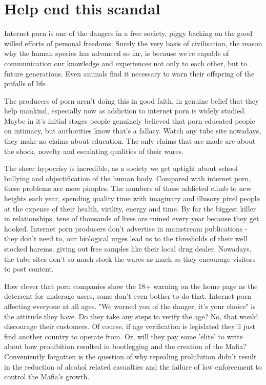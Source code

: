 \documentclass[easypeasy.tex]{subfiles}
\begin{document}
\section{Help end this scandal}

Internet porn is one of the dangers in a free society, piggy backing on the good willed efforts of personal freedoms. Surely the very basis of civilisation, the reason why the human species has advanced so far, is because we're capable of communication our knowledge and experiences not only to each other, but to future generations. Even animals find it necessary to warn their offspring of the pitfalls of life

The producers of porn aren't doing this in good faith, in genuine belief that they help mankind, especially now as addiction to internet porn is widely studied. Maybe in it's initial stages people genuinely believed that porn educated people on intimacy, but authorities know that's a fallacy. Watch any tube site nowadays, they make no claims about education. The only claims that are made are about the shock, novelty and escalating qualities of their wares.

The sheer hypocrisy is incredible, as a society we get uptight about school bullying and objectification of the human body. Compared with internet porn, these problems are mere pimples. The numbers of those addicted climb to new heights each year, spending quality time with imaginary and illusory pixel people at the expense of their health, virility, energy and time. By far the biggest killer in relationships, tens of thousands of lives are ruined every year because they get hooked. Internet porn producers don't advertise in mainstream publications - they don't need to, our biological urges lead us to the thresholds of their well stocked harems, giving out free samples like their local drug dealer. Nowadays, the tube sites don't so much stock the wares as much as they encourage visitors to post content.

How clever that porn companies show the 18+ warning on the home page as the deterrent for underage users, some don't even bother to do that. Internet porn affecting everyone at all ages. "We warned you of the danger, it's your choice" is the attitude they have. Do they take any steps to verify the age? No, that would discourage their customers. Of course, if age verification is legislated they'll just find another country to operate from. Or, will they pay some 'elite' to write about how prohibition resulted in bootlegging and the creation of the Mafia? Conveniently forgotten is the question of why repealing prohibition didn't result in the reduction of alcohol related casualties and the failure of law enforcement to control the Mafia's growth.
\end{document}
